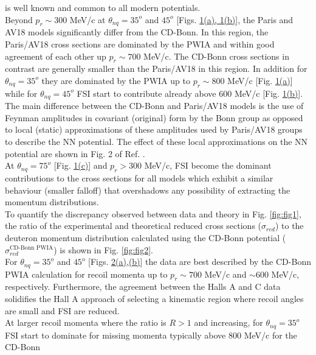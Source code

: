 is well known and common to all modern potentials. \\
\indent Beyond $p_{r}\sim300$ MeV/c at $\theta_{nq}=35^{o}$ and $45^{o}$ [Figs. \hyperref[fig:fig1]{1(a), 1(b)}], the Paris and
AV18 models significantly differ from the CD-Bonn. In this region, the Paris/AV18 cross sections are dominated by the PWIA and within good agreement of each other up $p_{r}\sim700$ MeV/c. The CD-Bonn cross sections in contrast are generally smaller than the Paris/AV18 in this region.  In addition for $\theta_{nq}=35^{o}$ they are dominated by the PWIA up to $p_{r}\sim800$ MeV/c [Fig. \hyperref[fig:fig1]{1(a)}]  while for $\theta_{nq}=45^{o}$  FSI start to contribute already above 600 MeV/c [Fig. \hyperref[fig:fig1]{1(b)}].
The main difference between the CD-Bonn and Paris/AV18 models is the use of Feynman amplitudes in covariant (original) form by the Bonn group as opposed to local (static) approximations of these amplitudes used by Paris/AV18 groups
to describe the NN potential. The effect of these local approximations on the NN potential are shown in Fig. 2 of Ref. \cite{PhysRevC.63.024001}. \\
\indent At $\theta_{nq}=75^{o}$ [Fig. \hyperref[fig:fig1]{1(c)}] and $p_{r}>300$ MeV/c, FSI become the dominant contributions to the cross sections for all models which exhibit a similar
behaviour (smaller falloff) that overshadows any possibility of extracting the momentum distributions.\\
\indent To quantify the discrepancy observed between data and theory in Fig. \ref{fig:fig1}, the ratio of the experimental and theoretical reduced cross sections ($\sigma_{red}$) to the
deuteron momentum distribution  calculated using the CD-Bonn potential ($\sigma^{\text{CD-Bonn PWIA}}_{red}$)\cite{PhysRevC.63.024001} is shown in Fig. \ref{fig:fig2}. \\
\indent For $\theta_{nq}=35^{o}$ and $45^{o}$ [Figs. \hyperref[fig:fig2]{2(a),(b)}] the data are best described by the CD-Bonn PWIA calculation for recoil momenta up
to $p_{r}\sim700$ MeV/c and $\sim600$ MeV/c, respectively. Furthermore, the agreement between the Halls A and C data solidifies the Hall A approach of selecting a kinematic
region where recoil angles are small and FSI are reduced. \\
\indent At larger recoil momenta where the ratio is $R>1$ and increasing, for $\theta_{nq}=35^{o}$ FSI start to dominate for
missing momenta typically above 800 MeV/c for the CD-Bonn
